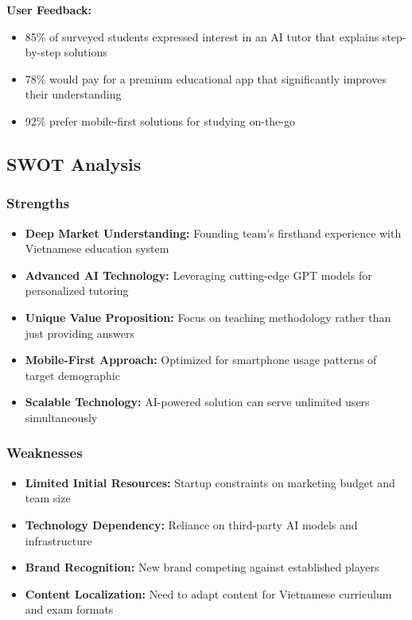 \textbf{User Feedback:}
\begin{itemize}
    \item 85\% of surveyed students expressed interest in an AI tutor that explains step-by-step solutions
    \item 78\% would pay for a premium educational app that significantly improves their understanding
    \item 92\% prefer mobile-first solutions for studying on-the-go
\end{itemize}

\subsection{SWOT Analysis}
\subsubsection{Strengths}
\begin{itemize}
    \item \textbf{Deep Market Understanding:} Founding team's firsthand experience with Vietnamese education system
    \item \textbf{Advanced AI Technology:} Leveraging cutting-edge GPT models for personalized tutoring
    \item \textbf{Unique Value Proposition:} Focus on teaching methodology rather than just providing answers
    \item \textbf{Mobile-First Approach:} Optimized for smartphone usage patterns of target demographic
    \item \textbf{Scalable Technology:} AI-powered solution can serve unlimited users simultaneously
\end{itemize}

\subsubsection{Weaknesses}
\begin{itemize}
    \item \textbf{Limited Initial Resources:} Startup constraints on marketing budget and team size
    \item \textbf{Technology Dependency:} Reliance on third-party AI models and infrastructure
    \item \textbf{Brand Recognition:} New brand competing against established players
    \item \textbf{Content Localization:} Need to adapt content for Vietnamese curriculum and exam formats
\end{itemize}

